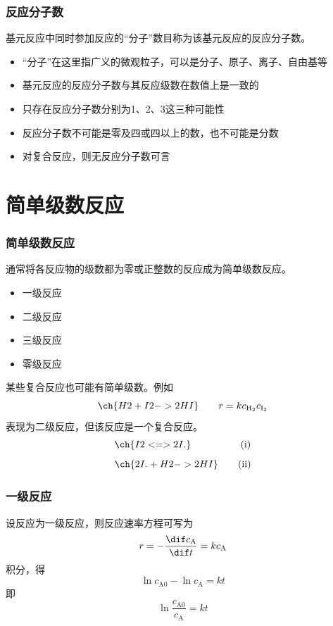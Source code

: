 \documentclass[dvipsnames, svgnames, x11names]{beamer}
\begin{document}
    
    
    
    
    \begin{frame}
        \frametitle{反应分子数}
    
        基元反应中同时参加反应的“分子”数目称为该基元反应的反应分子数。
    
        \begin{itemize}
            \item “分子”在这里指广义的微观粒子，可以是分子、原子、离子、自由基等
            \item 基元反应的反应分子数与其反应级数在数值上是一致的
            \item 只存在反应分子数分别为1、2、3这三种可能性
            \item 反应分子数不可能是零及四或四以上的数，也不可能是分数
            \item 对复合反应，则无反应分子数可言
        \end{itemize}
    
    \end{frame}


    \section{简单级数反应}


    \begin{frame}
        \frametitle{简单级数反应}

        通常将各反应物的级数都为零或正整数的反应成为简单级数反应。
    
        \begin{itemize}
            \item 一级反应
            \item 二级反应
            \item 三级反应
            \item 零级反应
        \end{itemize}
    
        某些复合反应也可能有简单级数。例如
        \[
            \ch{H2 + I2 -> 2 HI} \qquad r = k c_\mathrm{H_2}c_\mathrm{I_2}
        \]
        表现为二级反应，但该反应是一个复合反应。
        \[
            \ch{I2 <=> 2 I.} \qquad \qquad \quad (\mathrm{i})
        \]
        \[
            \ch{2 I. + H2 -> 2 HI} \qquad (\mathrm{ii})
        \]
    
    \end{frame}
    
    
    \begin{frame}
        \frametitle{一级反应}
    
        设反应为一级反应，则反应速率方程可写为
        \[
            r = - \frac{\dif c_\mathrm{A}}{\dif t} = k c_\mathrm{A}
        \]
        积分，得
        \[
            \ln c_\mathrm{A0} - \ln c_\mathrm{A} = kt
        \]
        即
        \[
            \ln \frac{c_\mathrm{A0}}{c_\mathrm{A}} = kt
        \]
    
    \end{frame}
\end{document}
